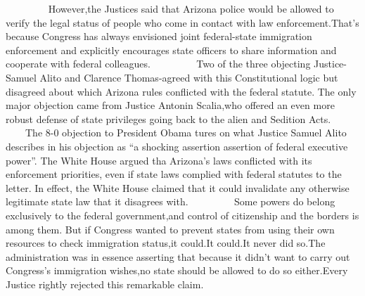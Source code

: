     
    However,the Justices said that Arizona police would be allowed to verify the legal status of people who come in contact with law enforcement.That’s because Congress has always envisioned joint federal-state immigration enforcement and explicitly encourages state officers to share information and cooperate with federal colleagues.
    
    Two of the three objecting Justice-Samuel Alito and Clarence Thomas-agreed with this Constitutional logic but disagreed about which Arizona rules conflicted with the federal statute. The only major objection came from Justice Antonin Scalia,who offered an even more robust defense of state privileges going back to the alien and Sedition Acts.
    
    The 8-0 objection to President Obama tures on what Justice Samuel Alito describes in his objection as “a shocking assertion assertion of federal executive power”. The White House argued tha Arizona’s laws conflicted with its enforcement priorities, even if state laws complied with federal statutes to the letter. In effect, the White House claimed that it could invalidate any otherwise legitimate state law that it disagrees with.
    
    Some powers do belong exclusively to the federal government,and control of citizenship and the borders is among them. But if Congress wanted to prevent states from using their own resources to check immigration status,it could.It could.It never did so.The administration was in essence asserting that because it didn't want to carry out Congress's immigration wishes,no state should be allowed to do so either.Every Justice rightly rejected this remarkable claim.
    

